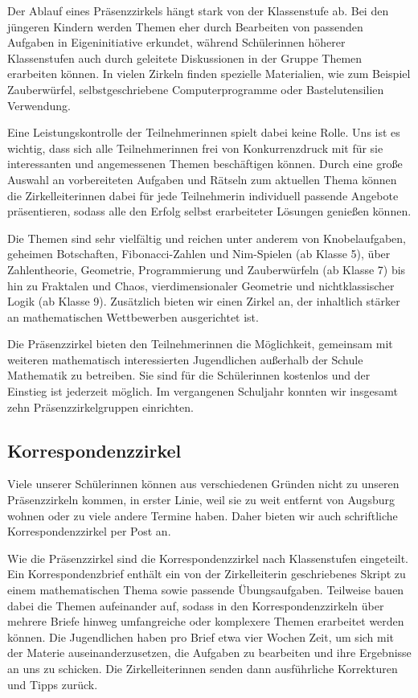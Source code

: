 \documentclass[12pt]{zettel}
\begin{document}
Der Ablauf eines Präsenzzirkels hängt stark von der Klassenstufe ab. Bei den
jüngeren Kindern werden Themen eher durch Bearbeiten von passenden
Aufgaben in Eigeninitiative erkundet, während Schülerinnen höherer
Klassenstufen auch durch geleitete Diskussionen in der Gruppe
Themen erarbeiten können. In vielen Zirkeln finden spezielle Materialien,
wie zum Beispiel Zauberwürfel, selbstgeschriebene Computerprogramme oder
Bastelutensilien Verwendung.

Eine Leistungskontrolle der Teilnehmerinnen spielt dabei keine Rolle. Uns ist es wichtig, dass sich alle Teilnehmerinnen frei von Konkurrenzdruck mit für sie interessanten
und angemessenen Themen beschäftigen können. Durch eine große Auswahl an vorbereiteten Aufgaben und Rätseln zum aktuellen Thema können die Zirkelleiterinnen dabei für
jede Teilnehmerin individuell passende Angebote präsentieren, sodass alle den Erfolg selbst erarbeiteter Lösungen genießen können.

Die Themen sind sehr vielfältig und reichen unter anderem von
Knobelaufgaben, geheimen Botschaften, Fibonacci-Zahlen und Nim-Spielen (ab Klasse 5),
über Zahlentheorie, Geometrie, Programmierung und Zauberwürfeln (ab Klasse 7) bis hin zu
Fraktalen und Chaos, vierdimensionaler Geometrie und nichtklassischer Logik
(ab Klasse 9). Zusätzlich bieten wir einen Zirkel an, der inhaltlich stärker an
mathematischen Wettbewerben ausgerichtet ist.

Die Präsenzzirkel bieten den Teilnehmerinnen die Möglichkeit,
gemeinsam mit weiteren mathematisch interessierten Jugendlichen außerhalb der
Schule Mathematik zu betreiben. Sie sind für die Schülerinnen kostenlos und der Einstieg ist jederzeit möglich. Im vergangenen Schuljahr konnten wir insgesamt zehn
Präsenzzirkelgruppen einrichten.

\subsection{Korrespondenzzirkel}

Viele unserer Schülerinnen können aus verschiedenen Gründen
nicht zu unseren Prä\-senz\-zir\-keln kommen, in erster Linie, weil sie zu weit
entfernt von Augsburg wohnen oder zu viele andere Termine haben.
Daher bieten wir auch schriftliche Korrespondenzzirkel per Post
an.

Wie die Präsenzzirkel sind die Korrespondenzzirkel nach Klassenstufen eingeteilt. Ein
Korrespondenzbrief enthält ein von der Zirkelleiterin geschriebenes Skript zu einem mathematischen Thema sowie passende
Übungsaufgaben. Teilweise bauen dabei die Themen aufeinander auf, sodass in den Korrespondenzzirkeln über mehrere Briefe hinweg umfangreiche oder komplexere Themen erarbeitet
werden können. Die Jugendlichen haben pro Brief etwa vier Wochen Zeit, um sich
mit der Materie auseinanderzusetzen, die Aufgaben zu bearbeiten und ihre Ergebnisse
an uns zu schicken. Die Zirkelleiterinnen senden dann
ausführliche Korrekturen und Tipps zurück.
\end{document}
